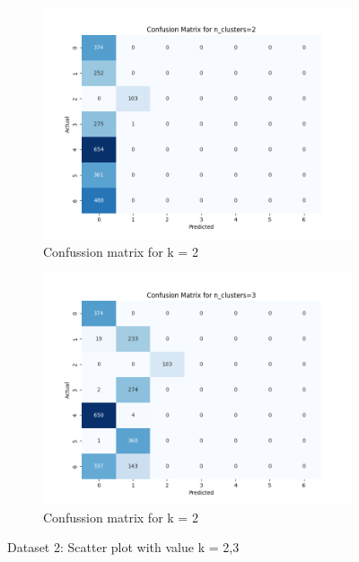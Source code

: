 \documentclass[12pt]{report}
\begin{document}
	\begin{figure}[H]
		\centering
		\begin{subfigure}{.5\textwidth}
			\centering
			\includegraphics[width=.9\linewidth]{../K-means/Output/Dataset2/confusionMatrix_k=2.png}
			\caption{Confussion matrix for k = 2}
			\label{Dataset2ConfusionMatrixk2}
		\end{subfigure}%
		\begin{subfigure}{.5\textwidth}
			\centering
			\includegraphics[width=.9\linewidth]{../K-means/Output/Dataset2/confusionMatrix_k=3.png}
			\caption{Confussion matrix for k = 2}
			\label{Dataset2ConfusionMatrixk3}
		\end{subfigure}
		\caption{Dataset 2: Scatter plot with value k = 2,3}
		\label{Dataset2ConfussionMatrix23}
	\end{figure}
\end{document}
